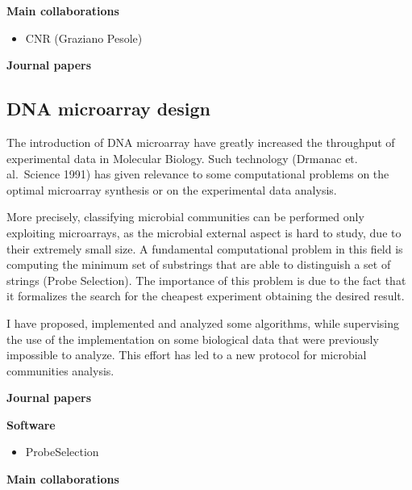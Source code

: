\documentclass[11pt,a4paper,roman]{moderncv}
\begin{document}
\textbf{Main collaborations}

\begin{itemize}
	\item
	      CNR (Graziano Pesole)
\end{itemize}

\textbf{Journal papers}

\cite{DBLP:journals/bioinformatics/DentiPPCVRB21}
\cite{DBLP:journals/bmcbi/DentiRBVPB18} \cite{DBLP:journals/jcb/BerettaBVPR14} \cite{DBLP:journals/bmcbi/PirolaRPPVB12}


\subsection{DNA microarray design}\label{dna-microarray-design}

The introduction of DNA microarray have greatly increased the throughput
of experimental data in Molecular Biology. Such technology (Drmanac et.
al.~Science 1991) has given relevance to some computational problems on
the optimal microarray synthesis or on the experimental data analysis.

More precisely, classifying microbial communities can be performed only
exploiting microarrays, as the microbial external aspect is hard to
study, due to their extremely small size. A fundamental computational
problem in this field is computing the minimum set of substrings that
are able to distinguish a set of strings (Probe Selection). The
importance of this problem is due to the fact that it formalizes the
search for the cheapest experiment obtaining the desired result.

I have proposed, implemented and analyzed some algorithms, while
supervising the use of the implementation on some biological data that
were previously impossible to analyze. This effort has led to a new
protocol for microbial communities analysis.

\textbf{Journal  papers}

\cite{DBLP:journals/bmcbi/RueggerVJB11}
\cite{valinskyAnalysisBacterialCommunity2002}
\cite{valinskyOligonucleotideFingerprintingRRNA2002}
\cite{bornemanProbeSelectionAlgorithms2001}

\textbf{Software}

\begin{itemize}
	\item
	      ProbeSelection
\end{itemize}


\textbf{Main collaborations}
\end{document}
